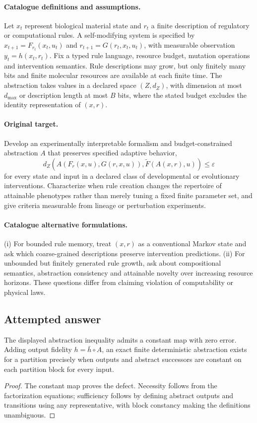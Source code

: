 \documentclass[11pt]{article}
\begin{document}
\paragraph{Catalogue definitions and assumptions.}
Let $x_t$ represent biological material state and $r_t$ a finite description of regulatory or computational rules. A self-modifying system is specified by $x_{t+1}=F_{r_t}(x_t,u_t)$ and $r_{t+1}=G(r_t,x_t,u_t)$, with measurable observation $y_t=h(x_t,r_t)$. Fix a typed rule language, resource budget, mutation operations and intervention semantics. Rule descriptions may grow, but only finitely many bits and finite molecular resources are available at each finite time. The abstraction takes values in a declared space $(Z,d_Z)$, with dimension at most $d_{\max}$ or description length at most $B$ bits, where the stated budget excludes the identity representation of $(x,r)$.
\paragraph{Original target.}
Develop an experimentally interpretable formalism and budget-constrained abstraction $A$ that preserves specified adaptive behavior,
\[d_Z\!\left(A(F_r(x,u),G(r,x,u)),\widetilde F(A(x,r),u)\right)\le\varepsilon\]
for every state and input in a declared class of developmental or evolutionary interventions. Characterize when rule creation changes the repertoire of attainable phenotypes rather than merely tuning a fixed finite parameter set, and give criteria measurable from lineage or perturbation experiments.
\paragraph{Catalogue alternative formulations.}
(i) For bounded rule memory, treat $(x,r)$ as a conventional Markov state and ask which coarse-grained descriptions preserve intervention predictions. (ii) For unbounded but finitely generated rule growth, ask about compositional semantics, abstraction consistency and attainable novelty over increasing resource horizons. These questions differ from claiming violation of computability or physical laws.
\subsection{Attempted answer}
\begin{proposition}
The displayed abstraction inequality admits a constant map with zero error. Adding output fidelity $h=\bar h\circ A$, an exact finite deterministic abstraction exists for a partition precisely when outputs and abstract successors are constant on each partition block for every input.
\end{proposition}
\begin{proof}
The constant map proves the defect. Necessity follows from the factorization equations; sufficiency follows by defining abstract outputs and transitions using any representative, with block constancy making the definitions unambiguous.
\end{proof}
\end{document}
